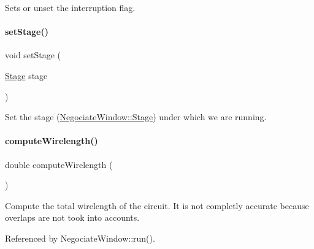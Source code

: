 Sets or unset the interruption flag. \mbox{\label{classKite_1_1NegociateWindow_aad6b43971b936f7ea003d3ad0fd07532}} 
\paragraph{\texorpdfstring{set\+Stage()}{setStage()}}
{\footnotesize\ttfamily void set\+Stage (\begin{DoxyParamCaption}\item[{\mbox{\hyperlink{classKite_1_1NegociateWindow_aca8133200c1122e29b87b314d82604eb}{Stage}}}]{stage }\end{DoxyParamCaption})\hspace{0.3cm}{\ttfamily [inline]}}

Set the stage (\mbox{\hyperlink{classKite_1_1NegociateWindow_aca8133200c1122e29b87b314d82604eb}{Negociate\+Window\+::\+Stage}}) under which we are running. \mbox{\label{classKite_1_1NegociateWindow_a4936106670361df6b6f3ef0b6088c9dc}} 
\paragraph{\texorpdfstring{compute\+Wirelength()}{computeWirelength()}}
{\footnotesize\ttfamily double compute\+Wirelength (\begin{DoxyParamCaption}{ }\end{DoxyParamCaption})}

Compute the total wirelength of the circuit. It is not completly accurate because overlaps are not took into accounts. 

Referenced by Negociate\+Window\+::run().

\mbox{\label{classKite_1_1NegociateWindow_a7bf31fcd4e4007e62454689ef7c553fc}} 
